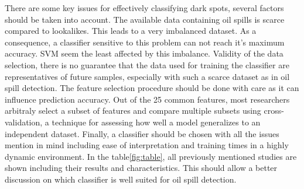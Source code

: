 There are some key issues for effectively classifying dark spots, several factors should be taken into account\cite{Kubat:1998:MLD:288808.288812}. The available data containing oil spills is scarce compared to lookalikes. This leads to a very imbalanced dataset. As a consequence, a classifier sensitive to this problem can not reach it's maximum accuracy\cite{Japkowicz20026}. SVM seem the least affected by this imbalance. Validity of the data selection, there is no guarantee that the data used for training the classifier are representatives of future samples, especially with such a scarce dataset as in oil spill detection. The feature selection procedure should be done with care as it can influence prediction accuracy. Out of the 25 common features, most researchers arbitraly select a subset of features and compare multiple subsets using cross-validation, a technique for assessing how well a model generalizes to an independent dataset. Finally, a classifier should be chosen with all the issues mention in mind including ease of interpretation and training times in a highly dynamic environment. In the table\ref{fig:table}, all previously mentioned studies are shown including their results and characteristics. This should allow a better discussion on which classifier is well suited for oil spill detection.

